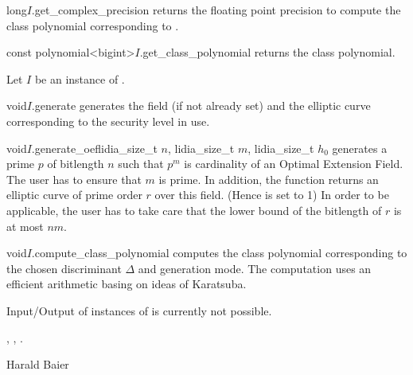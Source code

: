 \begin{cfcode}{long}{$I$.get_complex_precision}{}
  returns the floating point precision to compute the class polynomial
  corresponding to .
\end{cfcode}

\begin{cfcode}{const polynomial<bigint>}{$I$.get_class_polynomial}{}
  returns the class polynomial.
\end{cfcode}



\HIGH

Let $I$ be an instance of .

\begin{fcode}{void}{$I$.generate}{}
  generates the field (if not already set) and the elliptic curve
  corresponding to the security level in use.
\end{fcode}

\begin{fcode}{void}{$I$.generate_oef}{lidia_size_t $n$, lidia_size_t $m$, lidia_size_t $h_0$}
  generates a prime $p$ of bitlength $n$ such that $p^m$ is
  cardinality of an Optimal Extension Field. The user has to ensure
  that $m$ is prime. In addition, the function returns
  an elliptic curve of prime order $r$ over this field. (Hence
   is set to 1) In order
  to be applicable, the user has to take care that the lower bound
  of the bitlength of $r$ is at most $nm.$
\end{fcode}

\begin{fcode}{void}{$I$.compute_class_polynomial}{}
  computes the class polynomial corresponding to the chosen
  discriminant $\Delta$ and generation mode. The computation
  uses an efficient arithmetic basing on ideas of Karatsuba.
\end{fcode}


\IO

Input/Output of instances of 
is currently not possible.



\SEEALSO

, , .



\NOTES



\AUTHOR

Harald Baier
